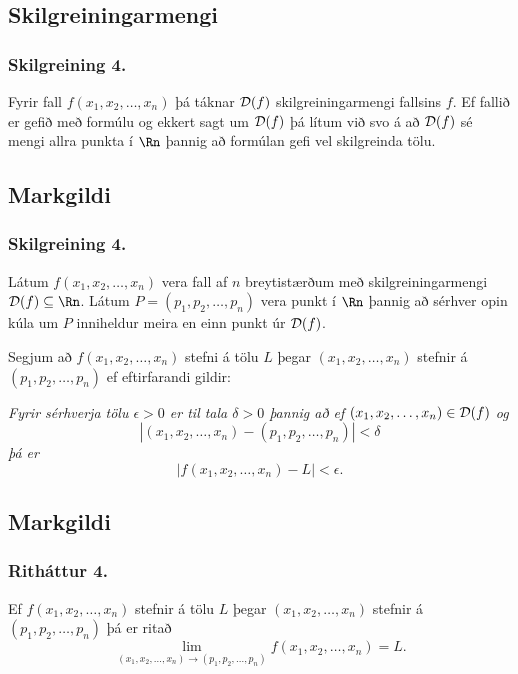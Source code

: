 \subsection{Skilgreiningarmengi}
 \subsubsection{Skilgreining 4.}
Fyrir fall $f(x_1,x_2,\ldots,x_n)$ þá táknar ${\cal D}(f)$ skilgreiningarmengi fallsins $f$.
Ef fallið er gefið með formúlu og ekkert sagt um ${\cal D}(f)$ þá lítum við svo á að ${\cal D}(f)$ sé mengi allra punkta í $\Rn$ þannig að formúlan gefi vel skilgreinda tölu.




\subsection{Markgildi}
 \subsubsection{Skilgreining 4.}
Látum $f(x_1,x_2,\ldots,x_n)$ vera fall af
$n$ breytistærðum með skilgreiningarmengi ${\cal D}(f)\subseteq \Rn$.
Látum $P=(p_1,p_2,\ldots,p_n)$ vera punkt í $\Rn$ þannig að sérhver
opin kúla um $P$ inniheldur meira en einn punkt úr ${\cal D}(f)$. 

\smallskip 
\noindent
Segjum að $f(x_1,x_2,\ldots,x_n)$  stefni á tölu $L$ þegar
$(x_1,x_2,\ldots,x_n)$  stefnir á $(p_1,p_2,\ldots,p_n)$ ef
eftirfarandi gildir: 

\smallskip
\noindent
{\em Fyrir sérhverja tölu $\epsilon>0$ er til tala $\delta>0$
þannig að ef $(x_1,x_2,\ldots,x_n)\in{\cal D}(f)$ og  
$$|(x_1,x_2,\ldots,x_n)-(p_1,p_2,\ldots,p_n)|<\delta$$ 
þá er 
$$|f(x_1,x_2,\ldots,x_n)-L|<\epsilon.$$}



\subsection{Markgildi}
\subsubsection{Ritháttur 4.}
Ef $f(x_1,x_2,\ldots,x_n)$  stefnir á tölu $L$ þegar $(x_1,x_2,\ldots,x_n)$  stefnir á $(p_1,p_2,\ldots,p_n)$ þá er ritað 
$$\lim_{(x_1,x_2,\ldots,x_n)\rightarrow (p_1,p_2,\ldots,p_n)}
f(x_1,x_2,\ldots,x_n)=L.$$
 


